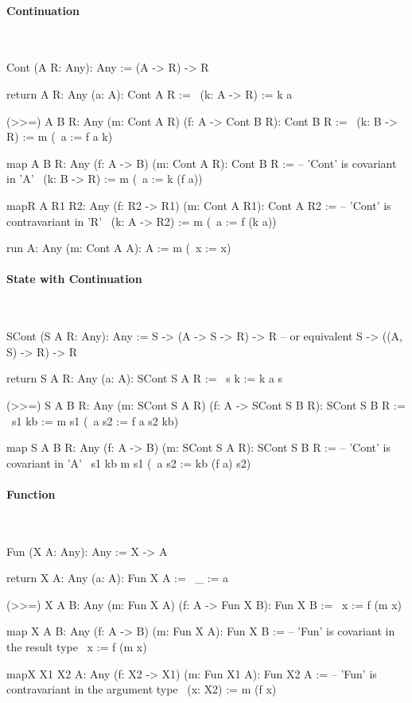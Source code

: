 \paragraph{Continuation}

\ \begin{alba}
    Cont (A R: Any): Any :=
        (A -> R) -> R

    return {A R: Any} (a: A): Cont A R :=
        \ (k: A -> R) := k a

    (>>=) {A B R: Any} (m: Cont A R) (f: A -> Cont B R): Cont B R :=
        \ (k: B -> R) :=
            m (\ a := f a k)

    map {A B R: Any} (f: A -> B) (m: Cont A R): Cont B R :=
            -- 'Cont' is covariant in 'A'
        \ (k: B -> R) :=
            m (\ a := k (f a))

    mapR {A R1 R2: Any} (f: R2 -> R1) (m: Cont A R1): Cont A R2 :=
            -- 'Cont' is contravariant in 'R'
        \ (k: A -> R2) :=
            m (\ a :=  f (k a))


    run {A: Any} (m: Cont A A): A :=
        m (\ x := x)
\end{alba}




\paragraph{State with Continuation}

\ \begin{alba}
    SCont (S A R: Any): Any :=
        S -> (A -> S -> R) -> R
        -- or equivalent
        S -> ((A, S) -> R) -> R

    return {S A R: Any} (a: A): SCont S A R :=
        \ s k := k a s

    (>>=) {S A B R: Any} (m: SCont S A R) (f: A -> SCont S B R): SCont S B R :=
        \  s1 kb :=
            m s1 (\ a s2 := f a s2 kb)

    map {S A B R: Any} (f: A -> B) (m: SCont S A R): SCont S B R :=
            -- 'Cont' is covariant in 'A'
        \ s1 kb
            m s1 (\ a s2 := kb (f a) s2)
\end{alba}




\paragraph{Function}

\ \begin{alba}
    Fun (X A: Any): Any :=
        X -> A

    return {X A: Any} (a: A): Fun X A :=
        \ _ := a

    (>>=) {X A B: Any} (m: Fun X A) (f: A -> Fun X B): Fun X B :=
        \ x :=
            f (m x)

    map {X A B: Any} (f: A -> B) (m: Fun X A): Fun X B :=
            -- 'Fun' is covariant in the result type
        \ x := f (m x)

    mapX {X1 X2 A: Any} (f: X2 -> X1) (m: Fun X1 A): Fun X2 A :=
            -- 'Fun' is contravariant in the argument type
        \ (x: X2) :=
            m (f x)
\end{alba}
